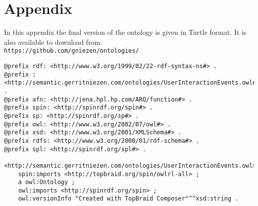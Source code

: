 \chapter{Appendix}

In this appendix the final version of the ontology is given in Turtle format. It is also available to download from:\\

\verb+https://github.com/gniezen/ontologies/+

\footnotesize
\begin{verbatim}
@prefix rdf: <http://www.w3.org/1999/02/22-rdf-syntax-ns#> .
@prefix : <http://semantic.gerritniezen.com/ontologies/UserInteractionEvents.owl#> .
@prefix afn: <http://jena.hpl.hp.com/ARQ/function#> .
@prefix spin: <http://spinrdf.org/spin#> .
@prefix sp: <http://spinrdf.org/sp#> .
@prefix owl: <http://www.w3.org/2002/07/owl#> .
@prefix xsd: <http://www.w3.org/2001/XMLSchema#> .
@prefix rdfs: <http://www.w3.org/2000/01/rdf-schema#> .
@prefix spl: <http://spinrdf.org/spl#> .

<http://semantic.gerritniezen.com/ontologies/UserInteractionEvents.owl>
    spin:imports <http://topbraid.org/spin/owlrl-all> ;
    a owl:Ontology ;
    owl:imports <http://spinrdf.org/spin> ;
    owl:versionInfo "Created with TopBraid Composer"^^xsd:string .


\end{verbatim}
